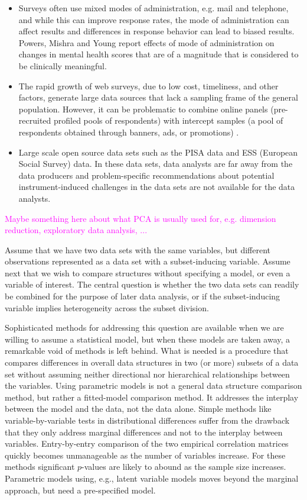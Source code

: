\documentclass[titlepage,11pt,twoside]{article}
\newcommand{\hl}[1]{\textcolor{magenta}{#1}}
\begin{document}
\begin{itemize}
\item Surveys often use mixed modes of administration, e.g. mail and telephone, and while this can improve response rates, the mode of administration can affect results \cite{Brambilla1987,McHorney1994} and differences in response behavior can lead to biased results. Powers, Mishra and Young \citeyearpar{Powers2005} report effects of mode of administration on changes in mental health scores that are of a magnitude that is considered to be clinically meaningful.
\item The rapid growth of web surveys, due to low cost, timeliness, and other factors, generate large data sources that lack a sampling frame of the general population. However, it can be problematic to combine online panels (pre-recruited profiled pools of respondents) with intercept samples (a pool of respondents obtained through banners, ads, or promotions) \cite{Liu2016}.
\item Large scale open source data sets such as the PISA data and ESS (European Social Survey) data. In these data sets, data analysts are far away from the data producers and problem-specific recommendations about potential instrument-induced challenges in the data sets are not available for the data analysts.
\end{itemize}

\hl{Maybe something here about what PCA is usually used for, e.g. dimension reduction, exploratory data analysis, ...}

Assume that we have two data sets with the same variables, but different observations represented as a data set with
a subset-inducing variable. Assume next that we wish to compare structures without specifying a model, or even a variable of interest. The central question is whether the two data sets can readily be combined for the purpose of later data analysis, or if the subset-inducing variable implies heterogeneity across the subset division.

Sophisticated methods for addressing this question are available when we are willing to assume a statistical model, but when these models are taken away, a remarkable void of methods is left behind. What is needed is a procedure that compares differences in overall data structures in two (or more) subsets of a data set without assuming neither directional nor hierarchical relationships between the variables. Using parametric models is not a general data structure comparison method, but rather a fitted-model comparison method. It addresses the interplay between the model and the data, not the data alone. 
Simple methods like variable-by-variable tests in distributional differences suffer from the drawback that they only address marginal differences and not to the interplay between variables. Entry-by-entry comparison of the two empirical correlation matrices quickly becomes unmanageable as the number of variables increase. For these methods significant $p$-values are likely to abound as the sample size increases. Parametric models using, e.g., latent variable models moves beyond the marginal approach, but need a pre-specified model.
\end{document}
